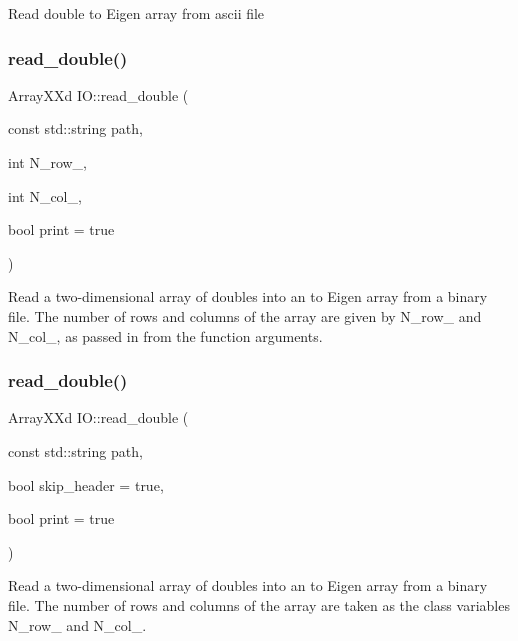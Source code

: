 Read double to Eigen array from ascii file\mbox{\label{class_i_o_aa2d53b758b98c564688d00ca5236744e}} 
\subsubsection{\texorpdfstring{read\_double()}{read\_double()}\hspace{0.1cm}{\footnotesize\ttfamily [1/2]}}
{\footnotesize\ttfamily Array\+X\+Xd I\+O\+::read\+\_\+double (\begin{DoxyParamCaption}\item[{const std\+::string}]{path,  }\item[{int}]{N\+\_\+row\+\_\+,  }\item[{int}]{N\+\_\+col\+\_\+,  }\item[{bool}]{print = {\ttfamily true} }\end{DoxyParamCaption})}

Read a two-\/dimensional array of doubles into an to Eigen array from a binary file. The number of rows and columns of the array are given by N\+\_\+row\+\_\+ and N\+\_\+col\+\_\+, as passed in from the function arguments.\mbox{\label{class_i_o_a34ed8843269915cb0b4eb8719da3535d}} 
\subsubsection{\texorpdfstring{read\_double()}{read\_double()}\hspace{0.1cm}{\footnotesize\ttfamily [2/2]}}
{\footnotesize\ttfamily Array\+X\+Xd I\+O\+::read\+\_\+double (\begin{DoxyParamCaption}\item[{const std\+::string}]{path,  }\item[{bool}]{skip\+\_\+header = {\ttfamily true},  }\item[{bool}]{print = {\ttfamily true} }\end{DoxyParamCaption})}

Read a two-\/dimensional array of doubles into an to Eigen array from a binary file. The number of rows and columns of the array are taken as the class variables N\+\_\+row\+\_\+ and N\+\_\+col\+\_\+.\mbox{\label{class_i_o_aed76c50d1122060292bfb10181edc990}} 
